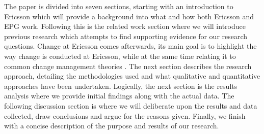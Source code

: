 \documentclass[fina_report_innit.tex]{subfiles}
\begin{document}
The paper is divided into seven sections, starting with an introduction to Ericsson which will provide a background into what and how both Ericsson and EPG work. Following this is the related work section where we will introduce previous research which attempts to find supporting evidence for our research questions. Change at Ericsson comes afterwards, its main goal is to highlight the way change is conducted at Ericsson, while at the same time relating it to common change management theories \cite{weick1999organizational} \cite{burnes2004kurt} \cite{van1995explaining} \cite{kotter1995leading} \cite{mintzberg1985strategies}. The next section describes the research approach, detailing the methodologies used and what qualitative and quantitative approaches have been undertaken. Logically, the next section is the results analysis where we provide initial findings along with the actual data. The following discussion section is where we will deliberate upon the results and data collected, draw conclusions and argue for the reasons given. Finally, we finish with a concise description of the purpose and results of our research.
\end{document}

